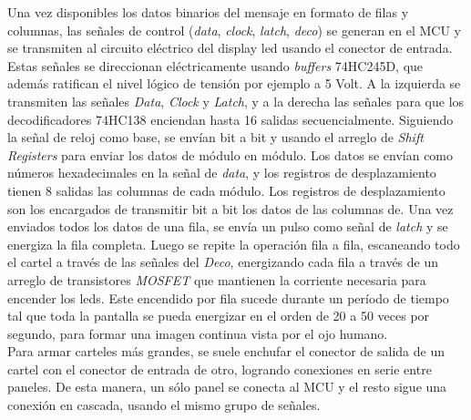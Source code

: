 Una vez disponibles los datos binarios del mensaje en formato de filas y columnas, las señales de control (\textit{data}, \textit{clock}, \textit{latch}, \textit{deco}) se generan en el MCU y se transmiten al circuito eléctrico del display led usando el conector de entrada. Estas señales se direccionan eléctricamente usando \textit{buffers} 74HC245D, que además ratifican el nivel lógico de tensión por ejemplo a 5 Volt. A la izquierda se transmiten las señales \textit{Data}, \textit{Clock} y \textit{Latch}, y a la derecha las señales para que los decodificadores 74HC138 enciendan hasta 16 salidas secuencialmente. Siguiendo la señal de reloj como base, se envían bit a bit  y usando el arreglo de \textit{Shift Registers} para enviar los datos de módulo en módulo. Los datos se envían como números hexadecimales en la señal de \textit{data}, y los registros de desplazamiento tienen 8 salidas las columnas de cada módulo. Los registros de desplazamiento son los encargados de transmitir bit a bit los datos de las columnas de. Una vez enviados todos los datos de una fila, se envía un pulso como señal de \textit{latch} y se energiza la fila completa. Luego se repite la operación fila a fila, escaneando todo el cartel a través de las señales del \textit{Deco}, energizando cada fila a través de un arreglo de transistores \textit{MOSFET} que mantienen la corriente necesaria para encender los leds. Este encendido por fila sucede durante un período de tiempo tal que toda la pantalla se pueda energizar en el orden de 20 a 50 veces por segundo, para formar una imagen continua vista por el ojo humano.\\

 
 Para armar carteles más grandes, se suele enchufar el conector de salida de un cartel con el conector de entrada de otro, logrando conexiones en serie entre paneles. De esta manera, un sólo panel se conecta al MCU y el resto sigue una conexión en cascada, usando el mismo grupo de señales.


